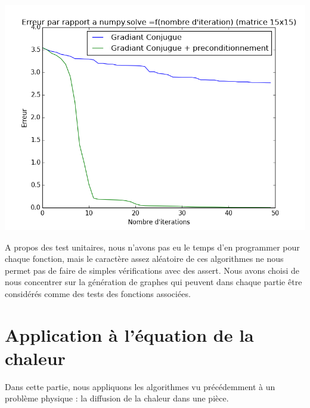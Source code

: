 \documentclass{article}
\begin{document}
\begin{enumerate}
\begin{center}
\includegraphics[scale=0.35]{figure_1.png}
\end{center}

A propos des test unitaires, nous n'avons pas eu le temps d'en programmer pour chaque fonction, mais le caractère assez aléatoire de ces algorithmes ne nous permet pas de faire de simples vérifications avec des assert. Nous avons choisi de nous concentrer sur la génération de graphes qui peuvent dans chaque partie être considérés comme des tests des fonctions associées.
\end{enumerate}

\section{Application à l'équation de la chaleur}

Dans cette partie, nous appliquons les algorithmes vu précédemment à un problème physique : la diffusion de la chaleur dans une pièce.
\end{document}
